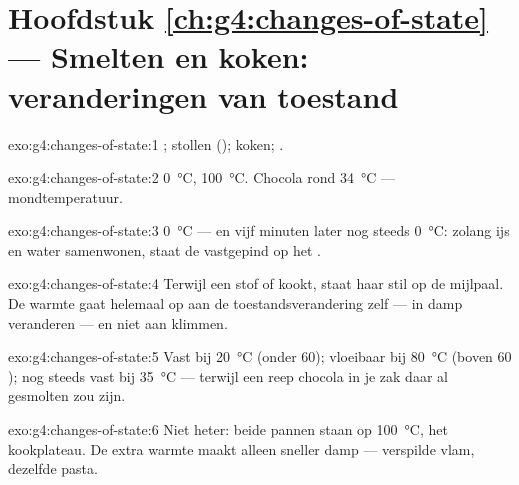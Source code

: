 \section*{Hoofdstuk \ref{ch:g4:changes-of-state} --- Smelten en koken: veranderingen van toestand}

\begin{solution}{exo:g4:changes-of-state:1}
; stollen (); koken; .
\end{solution}

\begin{solution}{exo:g4:changes-of-state:2}
 \qty{0}{\celsius},  \qty{100}{\celsius}. Chocola
 rond \qty{34}{\celsius} --- mondtemperatuur.
\end{solution}

\begin{solution}{exo:g4:changes-of-state:3}
\qty{0}{\celsius} --- en vijf minuten later nog steeds
\qty{0}{\celsius}: zolang ijs en water samenwonen, staat de
 vastgepind op het .
\end{solution}

\begin{solution}{exo:g4:changes-of-state:4}
Terwijl een stof  of kookt, staat haar  stil op de
mijlpaal. De warmte gaat helemaal op aan de toestandsverandering zelf
---  in damp veranderen --- en niet aan klimmen.
\end{solution}

\begin{solution}{exo:g4:changes-of-state:5}
Vast bij \qty{20}{\celsius} (onder $60$); vloeibaar bij
\qty{80}{\celsius} (boven $60$); nog steeds vast bij
\qty{35}{\celsius} --- terwijl een reep chocola in je zak daar al
gesmolten zou zijn.
\end{solution}

\begin{solution}{exo:g4:changes-of-state:6}
Niet heter: beide pannen staan op \qty{100}{\celsius}, het
kookplateau. De extra warmte maakt alleen sneller damp --- verspilde
vlam, dezelfde pasta.
\end{solution}

